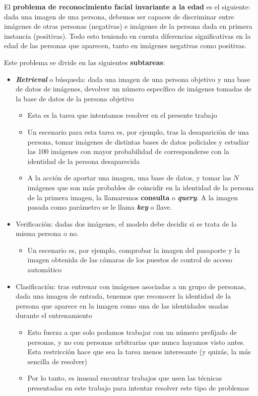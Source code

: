 El \textbf{problema de reconocimiento facial invariante a la edad} es el siguiente: dada una imagen de una persona, debemos ser capaces de discriminar entre imágenes de otras personas (negativas) e imágenes de la persona dada en primera instancia (positivas). Todo esto teniendo en cuenta diferencias significativas en la edad de las personas que aparecen, tanto en imágenes negativas como positivas.

Este problema se divide en las siguientes \textbf{subtareas}:

\begin{itemize}
    \item \textbf{\textit{Retrieval}} o búsqueda: dada una imagen de una persona objetivo y una base de datos de imágenes, devolver un número específico de imágenes tomadas de la base de datos de la persona objetivo

        \begin{itemize}
            \item Esta es la tarea que intentamos resolver en el presente trabajo
            \item Un escenario para esta tarea es, por ejemplo, tras la desaparición de una persona, tomar imágenes de distintas bases de datos policiales y estudiar las 100 imágenes con mayor probabilidad de corresponderse con la identidad de la persona desaparecida
            \item A la acción de aportar una imagen, una base de datos, y tomar las $N$ imágenes que son más probables de coincidir en la identidad de la persona de la primera imagen, la llamaremos \textbf{consulta} o \textbf{\textit{query}}. A la imagen pasada como parámetro se le llama \textbf{\textit{key}} o llave.
        \end{itemize}

    \item Verificación: dadas dos imágenes, el modelo debe decidir si se trata de la misma persona o no.
        \begin{itemize}
            \item Un escenario es, por ejemplo, comprobar la imagen del pasaporte y la imagen obtenida de las cámaras de los puestos de control de acceso automático \cite{informatica:docface}
        \end{itemize}

    \item Clasificación: tras entrenar con imágenes asociadas a un grupo de personas, dada una imagen de entrada, tenemos que reconocer la identidad de la persona que aparece en la imagen como una de las identidades usadas durante el entrenamiento
        \begin{itemize}
            \item Esto fuerza a que solo podamos trabajar con un número prefijado de personas, y no con personas arbitrarias que nunca hayamos visto antes. Esta restricción hace que sea la tarea menos interesante (y quizás, la más sencilla de resolver)
            \item Por lo tanto, es inusual encontrar trabajos que usen las técnicas presentadas en este trabajo para intentar resolver este tipo de problemas
        \end{itemize}


\end{itemize}
